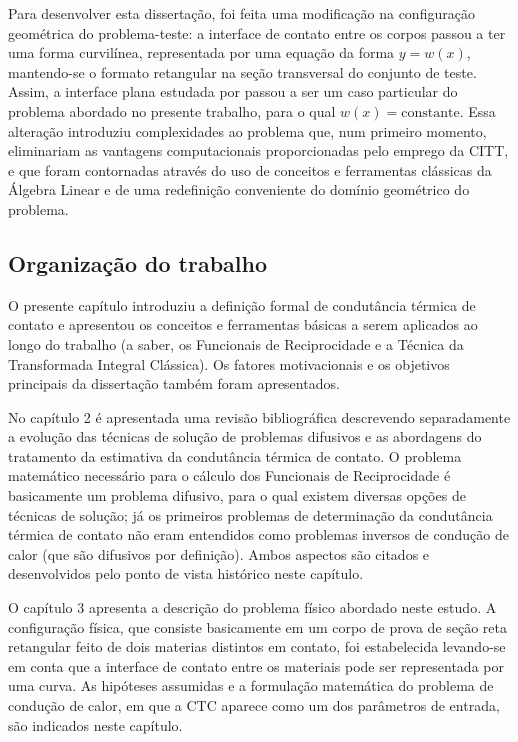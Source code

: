 Para desenvolver esta dissertação, foi feita uma modificação na configuração geométrica do problema-teste: a interface de contato entre os corpos passou a
ter uma forma curvilínea, representada por uma equação da forma $y = w(x)$, mantendo-se o formato retangular na seção transversal do conjunto
de teste. Assim, a interface plana estudada por \cite{tese_padilha} passou a ser um caso particular do problema abordado no presente trabalho, para
o qual $w(x) = \text{constante}$. Essa alteração introduziu complexidades ao problema que, num primeiro momento, eliminariam as vantagens computacionais
proporcionadas pelo emprego da CITT, e que foram contornadas através do uso de conceitos e ferramentas clássicas da Álgebra Linear e de uma redefinição conveniente
do domínio geométrico do problema.

\subsection{Organização do trabalho}

O presente capítulo introduziu a definição formal de condutância térmica de contato e apresentou os conceitos e ferramentas básicas a serem aplicados ao longo do trabalho (a saber, os Funcionais de Reciprocidade e a Técnica da Transformada Integral Clássica). Os fatores motivacionais e os objetivos principais da dissertação também foram apresentados.

No capítulo 2 é apresentada uma revisão bibliográfica descrevendo separadamente a evolução das técnicas de solução de problemas difusivos e as abordagens do tratamento da estimativa da condutância térmica de contato. O problema matemático necessário para o cálculo dos Funcionais de Reciprocidade é basicamente um problema difusivo, para o qual existem diversas opções de técnicas de solução; já os primeiros problemas de determinação da condutância térmica de contato não eram entendidos como problemas inversos de condução de calor (que são difusivos por definição). Ambos aspectos são citados e desenvolvidos pelo ponto de vista histórico neste capítulo.

O capítulo 3 apresenta a descrição do problema físico abordado neste estudo. A configuração física, que consiste basicamente em um corpo de prova de seção reta retangular feito de dois materias distintos em contato, foi estabelecida levando-se em conta que a interface de contato entre os materiais pode ser representada por uma curva. As hipóteses assumidas e a formulação matemática do problema de condução de calor, em que a CTC aparece como um dos parâmetros de entrada, são indicados neste capítulo.

